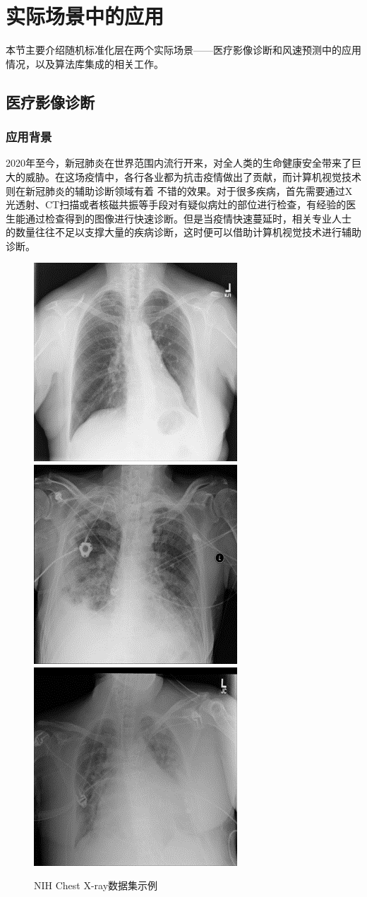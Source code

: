 
\chapter{实际场景中的应用}

本节主要介绍随机标准化层在两个实际场景——医疗影像诊断和风速预测中的应用情况，以及算法库集成的相关工作。

\section{医疗影像诊断}

\subsection{应用背景}

2020年至今，新冠肺炎在世界范围内流行开来，对全人类的生命健康安全带来了巨大的威胁。在这场疫情中，各行各业都为抗击疫情做出了贡献，而计算机视觉技术则在新冠肺炎的辅助诊断领域有着
不错的效果。对于很多疾病，首先需要通过X光透射、CT扫描或者核磁共振等手段对有疑似病灶的部位进行检查，有经验的医生能通过检查得到的图像进行快速诊断。但是当疫情快速蔓延时，相关专业人士
的数量往往不足以支撑大量的疾病诊断，这时便可以借助计算机视觉技术进行辅助诊断。

\begin{figure}
  \centering
    {\includegraphics[width=0.3\linewidth]{figures/nih/1.png}}
    {\includegraphics[width=0.3\linewidth]{figures/nih/2.png}}
    {\includegraphics[width=0.3\linewidth]{figures/nih/3.png}}
  \caption{NIH Chest X-ray数据集示例}
  \label{fig:nih}
\end{figure}

